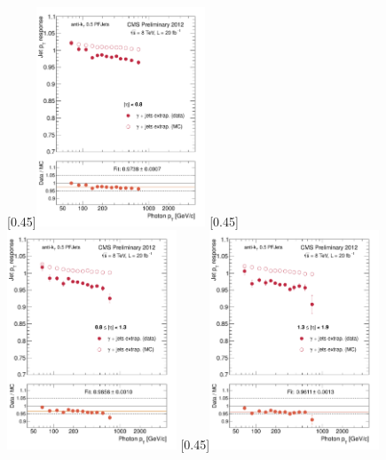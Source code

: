 \begin{figure}[p!]
    \centering
    \subcaptionbox{\label{fig:bal_extrap_eta008}}[0.45\textwidth]{\includegraphics[width=0.45\textwidth]{chapitre4/figs/resp_balancing_extrap/response_eta008_balancing_extrap.pdf}}\hfill
    \subcaptionbox{\label{fig:bal_extrap_eta0813}}[0.45\textwidth]{\includegraphics[width=0.45\textwidth]{chapitre4/figs/resp_balancing_extrap/response_eta0813_balancing_extrap.pdf}}
    \subcaptionbox{\label{fig:bal_extrap_eta1319}}[0.45\textwidth]{\includegraphics[width=0.45\textwidth]{chapitre4/figs/resp_balancing_extrap/response_eta1319_balancing_extrap.pdf}}\hfill

\end{figure}
